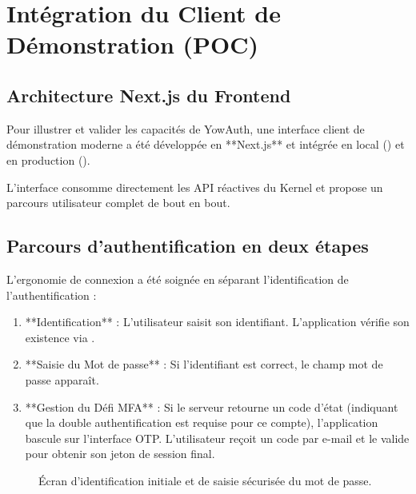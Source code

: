 \chapter{Intégration du Client de Démonstration (POC)}

\section{Architecture Next.js du Frontend}
Pour illustrer et valider les capacités de YowAuth, une interface client de démonstration moderne a été développée en **Next.js** et intégrée en local () et en production ().

L'interface consomme directement les API réactives du Kernel et propose un parcours utilisateur complet de bout en bout.

\section{Parcours d'authentification en deux étapes}
L'ergonomie de connexion a été soignée en séparant l'identification de l'authentification :
\begin{enumerate}
  \item **Identification** : L'utilisateur saisit son identifiant. L'application vérifie son existence via .
  \item **Saisie du Mot de passe** : Si l'identifiant est correct, le champ mot de passe apparaît. 
  \item **Gestion du Défi MFA** : Si le serveur retourne un code d'état  (indiquant que la double authentification est requise pour ce compte), l'application bascule sur l'interface OTP. L'utilisateur reçoit un code par e-mail et le valide pour obtenir son jeton de session final.
\end{enumerate}

\begin{figure}[h]
  \centering
  \caption{Écran d'identification initiale et de saisie sécurisée du mot de passe.}
  \label{fig:poc-login-steps}
\end{figure}

